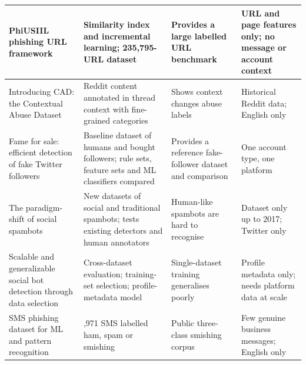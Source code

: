 \begin{footnotesize}
\begin{longtable}{|>{\raggedright\arraybackslash}p{3.2cm}|>{\raggedright\arraybackslash}p{3.7cm}|>{\raggedright\arraybackslash}p{3.7cm}|>{\raggedright\arraybackslash}p{3.2cm}|}
[6] PhiUSIIL phishing URL framework & Similarity index and incremental learning; 235,795-URL dataset & Provides a large labelled URL benchmark & URL and page features only; no message or account context \\ \hline
[7] Introducing CAD: the Contextual Abuse Dataset & Reddit content annotated in thread context with fine-grained categories & Shows context changes abuse labels & Historical Reddit data; English only \\ \hline
\cite{cresci2015} Fame for sale: efficient detection of fake Twitter followers & Baseline dataset of humans and bought followers; rule sets, feature sets and ML classifiers compared & Provides a reference fake-follower dataset and comparison & One account type, one platform \\ \hline
\cite{cresci2017} The paradigm-shift of social spambots & New datasets of social and traditional spambots; tests existing detectors and human annotators & Human-like spambots are hard to recognise & Dataset only up to 2017; Twitter only \\ \hline
\cite{yang2020} Scalable and generalizable social bot detection through data selection & Cross-dataset evaluation; training-set selection; profile-metadata model & Single-dataset training generalises poorly & Profile metadata only; needs platform data at scale \\ \hline
\cite{smsdata} SMS phishing dataset for ML and pattern recognition & 5,971 SMS labelled ham, spam or smishing & Public three-class smishing corpus & Few genuine business messages; English only \\ \hline
\end{longtable}
\end{footnotesize}

